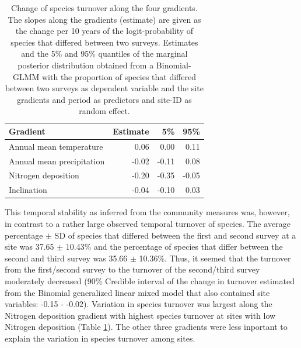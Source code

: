 \documentclass[fleqn,10pt,lineno]{wlpeerj} %
\theoremstyle{definition}
\theoremstyle{definition}
\theoremstyle{definition}
\theoremstyle{remark}
\begin{document}
\begin{table}

\caption{\label{tab:turnovertab}Change of species turnover along the four gradients. The slopes along the gradients (estimate) are given as the change per 10 years of the logit-probability of species that differed between two surveys. Estimates and the 5\% and 95\% quantiles of the marginal posterior distribution obtained from a Binomial-GLMM with the proportion of species that differed between two surveys as dependent variable and the site gradients and period as predictors and site-ID as random effect.}
\centering
\begin{tabular}[t]{lrrr}
\toprule
Gradient & Estimate & 5\% & 95\%\\
\midrule
Annual mean temperature & 0.06 & 0.00 & 0.11\\
Annual mean precipitation & -0.02 & -0.11 & 0.08\\
Nitrogen deposition & -0.20 & -0.35 & -0.05\\
Inclination & -0.04 & -0.10 & 0.03\\
\bottomrule
\end{tabular}
\end{table}

This temporal stability as inferred from the community measures was,
however, in contrast to a rather large observed temporal turnover of
species. The average percentage \(\pm\) SD of species that differed
between the first and second survey at a site was 37.65 \(\pm\) 10.43\%
and the percentage of species that differ between the second and third
survey was 35.66 \(\pm\) 10.36\%. Thus, it seemed that the turnover from
the first/second survey to the turnover of the second/third survey
moderately decreased (90\% Credible interval of the change in turnover
estimated from the Binomial generalized linear mixed model that also
contained site variables: -0.15 - -0.02). Variation in species turnover
was largest along the Nitrogen deposition gradient with highest species
turnover at sites with low Nitrogen deposition (Table
\ref{tab:turnovertab}). The other three gradients were less inportant to
explain the variation in species turnover among sites.
\end{document}
